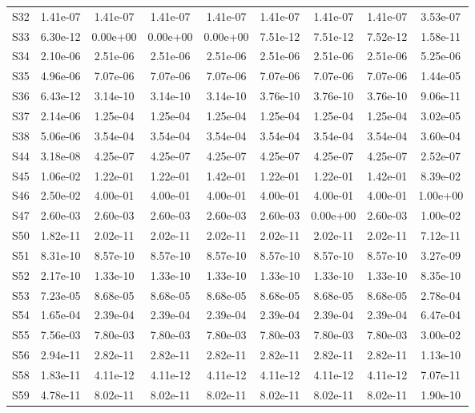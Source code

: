 {\begin{longtable}{l S[table-format=1.2e+2] S[table-format=1.2e+2] S[table-format=1.2e+2] S[table-format=1.2e+2] S[table-format=1.2e+2] S[table-format=1.2e+2] S[table-format=1.2e+2] S[table-format=1.2e+2]}
S32 & 1.41e-07 & 1.41e-07 & 1.41e-07 & 1.41e-07 & 1.41e-07 & 1.41e-07 & 1.41e-07 & 3.53e-07 \\
S33 & 6.30e-12 & 0.00e+00 & 0.00e+00 & 0.00e+00 & 7.51e-12 & 7.51e-12 & 7.52e-12 & 1.58e-11 \\
S34 & 2.10e-06 & 2.51e-06 & 2.51e-06 & 2.51e-06 & 2.51e-06 & 2.51e-06 & 2.51e-06 & 5.25e-06 \\
S35 & 4.96e-06 & 7.07e-06 & 7.07e-06 & 7.07e-06 & 7.07e-06 & 7.07e-06 & 7.07e-06 & 1.44e-05 \\
S36 & 6.43e-12 & 3.14e-10 & 3.14e-10 & 3.14e-10 & 3.76e-10 & 3.76e-10 & 3.76e-10 & 9.06e-11 \\
S37 & 2.14e-06 & 1.25e-04 & 1.25e-04 & 1.25e-04 & 1.25e-04 & 1.25e-04 & 1.25e-04 & 3.02e-05 \\
S38 & 5.06e-06 & 3.54e-04 & 3.54e-04 & 3.54e-04 & 3.54e-04 & 3.54e-04 & 3.54e-04 & 3.60e-04 \\
S44 & 3.18e-08 & 4.25e-07 & 4.25e-07 & 4.25e-07 & 4.25e-07 & 4.25e-07 & 4.25e-07 & 2.52e-07 \\
S45 & 1.06e-02 & 1.22e-01 & 1.22e-01 & 1.42e-01 & 1.22e-01 & 1.22e-01 & 1.42e-01 & 8.39e-02 \\
S46 & 2.50e-02 & 4.00e-01 & 4.00e-01 & 4.00e-01 & 4.00e-01 & 4.00e-01 & 4.00e-01 & 1.00e+00 \\
S47 & 2.60e-03 & 2.60e-03 & 2.60e-03 & 2.60e-03 & 2.60e-03 & 0.00e+00 & 2.60e-03 & 1.00e-02 \\
S50 & 1.82e-11 & 2.02e-11 & 2.02e-11 & 2.02e-11 & 2.02e-11 & 2.02e-11 & 2.02e-11 & 7.12e-11 \\
S51 & 8.31e-10 & 8.57e-10 & 8.57e-10 & 8.57e-10 & 8.57e-10 & 8.57e-10 & 8.57e-10 & 3.27e-09 \\
S52 & 2.17e-10 & 1.33e-10 & 1.33e-10 & 1.33e-10 & 1.33e-10 & 1.33e-10 & 1.33e-10 & 8.35e-10 \\
S53 & 7.23e-05 & 8.68e-05 & 8.68e-05 & 8.68e-05 & 8.68e-05 & 8.68e-05 & 8.68e-05 & 2.78e-04 \\
S54 & 1.65e-04 & 2.39e-04 & 2.39e-04 & 2.39e-04 & 2.39e-04 & 2.39e-04 & 2.39e-04 & 6.47e-04 \\
S55 & 7.56e-03 & 7.80e-03 & 7.80e-03 & 7.80e-03 & 7.80e-03 & 7.80e-03 & 7.80e-03 & 3.00e-02 \\
S56 & 2.94e-11 & 2.82e-11 & 2.82e-11 & 2.82e-11 & 2.82e-11 & 2.82e-11 & 2.82e-11 & 1.13e-10 \\
S58 & 1.83e-11 & 4.11e-12 & 4.11e-12 & 4.11e-12 & 4.11e-12 & 4.11e-12 & 4.11e-12 & 7.07e-11 \\
S59 & 4.78e-11 & 8.02e-11 & 8.02e-11 & 8.02e-11 & 8.02e-11 & 8.02e-11 & 8.02e-11 & 1.90e-10 \\

\end{longtable}}
